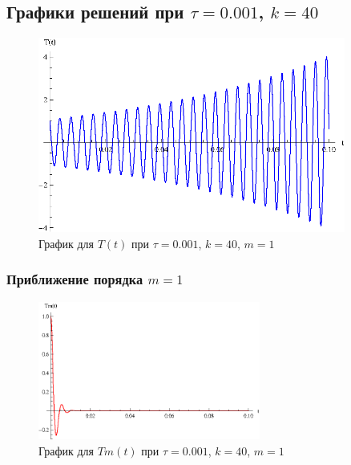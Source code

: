 \newpage

\subsection{Графики решений при $\tau=0.001$, $k=40$}

\vfill

\begin{figure}[h]
\begin{center}
\includegraphics[width=0.9\textwidth]{./3_results/4_1.eps}
\end{center}
\caption{График для $T(t)$ при $\tau=0.001$, $k=40$, $m=1$}
\end{figure}

\vfill

\newpage

\subsubsection{Приближение порядка $m=1$}

\begin{figure}[h]
\begin{center}
\includegraphics[width=0.65\textwidth]{./3_results/4_2.eps}
\end{center}
\caption{График для $Tm(t)$ при $\tau=0.001$, $k=40$, $m=1$}
\end{figure}

